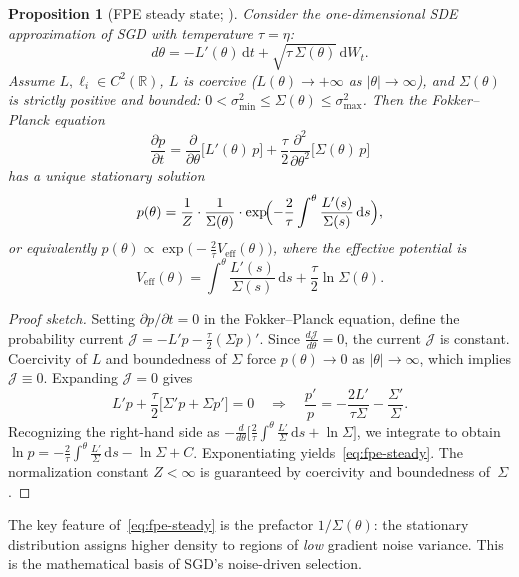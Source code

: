 \documentclass[11pt,a4paper]{article}
\newtheorem{proposition}[theorem]{Proposition}
\newcommand{\R}{\mathbb{R}}
\newcommand{\dif}{\,\mathrm{d}}
\newcommand{\Veff}{V_{\mathrm{eff}}}
\begin{document}
\begin{proposition}[FPE steady state; \citealt{horsthemke1984noise,chaudhari2018stochastic}]
\label{prop:fpe}
Consider the one-dimensional SDE approximation of SGD with temperature
$\tau = \eta$:
\[
  d\theta = -L'(\theta)\dif t + \sqrt{\tau\,\Sigma(\theta)}\dif W_t.
\]
Assume $L,\ell_i \in C^2(\R)$, $L$ is coercive ($L(\theta)\to+\infty$ as
$|\theta|\to\infty$), and $\Sigma(\theta)$ is strictly positive and bounded:
$0 < \sigma_{\min}^2 \le \Sigma(\theta) \le \sigma_{\max}^2$.
Then the Fokker--Planck equation
\[
  \frac{\partial p}{\partial t}
  = \frac{\partial}{\partial\theta}\bigl[L'(\theta)\,p\bigr]
    + \frac{\tau}{2}\frac{\partial^2}{\partial\theta^2}\bigl[\Sigma(\theta)\,p\bigr]
\]
has a unique stationary solution
\begin{equation}\label{eq:fpe-steady}
  p(\theta)
  = \frac{1}{Z}\cdot\frac{1}{\Sigma(\theta)}
    \cdot\exp\!\Bigl(-\frac{2}{\tau}\int^{\theta}
      \frac{L'(s)}{\Sigma(s)}\dif s\Bigr),
\end{equation}
or equivalently $p(\theta) \propto \exp\!\bigl(-\frac{2}{\tau}\Veff(\theta)\bigr)$,
where the effective potential is
\begin{equation}\label{eq:veff}
  \Veff(\theta) = \int^{\theta}\frac{L'(s)}{\Sigma(s)}\dif s
    + \frac{\tau}{2}\ln\Sigma(\theta).
\end{equation}
\end{proposition}

\begin{proof}[Proof sketch]
Setting $\partial p/\partial t = 0$ in the Fokker--Planck equation, define the
probability current $\mathcal{J} = -L'p - \frac{\tau}{2}(\Sigma p)'$.
Since $\frac{d\mathcal{J}}{d\theta} = 0$, the current $\mathcal{J}$ is
constant.  Coercivity of $L$ and boundedness of $\Sigma$ force $p(\theta)\to 0$
as $|\theta|\to\infty$, which implies $\mathcal{J}\equiv 0$.
Expanding $\mathcal{J}=0$ gives
\[
  L'p + \frac{\tau}{2}\bigl[\Sigma' p + \Sigma p'\bigr] = 0
  \quad\Longrightarrow\quad
  \frac{p'}{p} = -\frac{2L'}{\tau\Sigma} - \frac{\Sigma'}{\Sigma}.
\]
Recognizing the right-hand side as
$-\frac{d}{d\theta}\bigl[\frac{2}{\tau}\int^{\theta}\frac{L'}{{\Sigma}}\dif s
+ \ln\Sigma\bigr]$, we integrate to obtain
$\ln p = -\frac{2}{\tau}\int^{\theta}\frac{L'}{\Sigma}\dif s - \ln\Sigma + C$.
Exponentiating yields~\eqref{eq:fpe-steady}.  The normalization constant
$Z<\infty$ is guaranteed by coercivity and boundedness of~$\Sigma$.
\end{proof}

The key feature of~\eqref{eq:fpe-steady} is the prefactor $1/\Sigma(\theta)$:
the stationary distribution assigns higher density to regions of \emph{low}
gradient noise variance.  This is the mathematical basis of SGD's noise-driven
selection.
\end{document}
